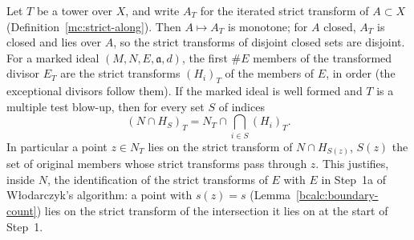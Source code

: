 \begin{lemma}
\label{bcalc:member-intersection-tower}
\mixedleanok
Let \(T\) be a tower over \(X\), and write \(A_T\) for the iterated strict transform of \(A\subset X\) (Definition~\ref{mc:strict-along}). Then \(A\mapsto A_T\) is
monotone; for \(A\) closed, \(A_T\) is closed and lies over \(A\), so the strict transforms of disjoint closed sets are disjoint. For a marked ideal
\((M,N,E,\mathfrak a,d)\), the first \(\#E\) members of the transformed divisor \(E_T\) are the strict transforms \((H_i)_T\) of the members of \(E\), in
order (the exceptional divisors follow them). If the marked ideal is well formed and \(T\) is a multiple test blow-up, then for every set \(S\) of indices
\[
(N\cap H_S)_T=N_T\cap\bigcap_{i\in S}(H_i)_T .
\]
In particular a point \(z\in N_T\) lies on the strict transform of \(N\cap H_{S(z)}\), \(S(z)\) the set of original members whose strict transforms pass
through \(z\). This justifies, inside \(N\), the identification of the strict transforms of \(E\) with \(E\) in Step~1a of Włodarczyk's algorithm: a point with
\(s(z)=s\) (Lemma~\ref{bcalc:boundary-count}) lies on the strict transform of the intersection it lies on at the start of Step~1.
\end{lemma}
